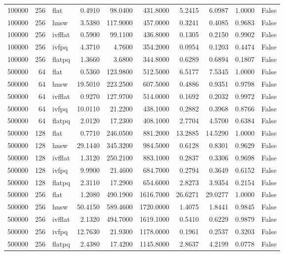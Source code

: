 \begin{tabular}{rrlrrrrrrr}
100000 & 256 & flat & 0.4910 & 98.0400 & 431.8000 & 5.2415 & 6.0987 & 1.0000 & False \\
100000 & 256 & hnsw & 3.5380 & 117.9000 & 457.0000 & 0.3241 & 0.4085 & 0.9683 & False \\
100000 & 256 & ivfflat & 0.5900 & 99.1100 & 436.8000 & 0.1305 & 0.2150 & 0.9902 & False \\
100000 & 256 & ivfpq & 4.3710 & 4.7600 & 354.2000 & 0.0954 & 0.1203 & 0.4474 & False \\
100000 & 256 & flatpq & 1.3660 & 3.6800 & 344.8000 & 0.6289 & 0.6894 & 0.1807 & False \\
500000 & 64 & flat & 0.5360 & 123.9800 & 512.5000 & 6.5177 & 7.5345 & 1.0000 & False \\
500000 & 64 & hnsw & 19.5010 & 223.2500 & 607.5000 & 0.4886 & 0.9351 & 0.9798 & False \\
500000 & 64 & ivfflat & 0.9270 & 127.9700 & 514.0000 & 0.1692 & 0.2032 & 0.9972 & False \\
500000 & 64 & ivfpq & 10.0110 & 21.2200 & 438.1000 & 0.2882 & 0.3968 & 0.8766 & False \\
500000 & 64 & flatpq & 2.0120 & 17.2300 & 408.1000 & 2.7704 & 4.5700 & 0.6384 & False \\
500000 & 128 & flat & 0.7710 & 246.0500 & 881.2000 & 13.2885 & 14.5290 & 1.0000 & False \\
500000 & 128 & hnsw & 29.1440 & 345.3200 & 984.5000 & 0.6128 & 0.8301 & 0.9629 & False \\
500000 & 128 & ivfflat & 1.3120 & 250.2100 & 883.1000 & 0.2837 & 0.3306 & 0.9698 & False \\
500000 & 128 & ivfpq & 9.9900 & 21.4600 & 684.7000 & 0.2794 & 0.3649 & 0.6152 & False \\
500000 & 128 & flatpq & 2.3110 & 17.2900 & 654.6000 & 2.8273 & 3.9354 & 0.2154 & False \\
500000 & 256 & flat & 1.2080 & 490.1900 & 1616.7000 & 26.6271 & 29.0277 & 1.0000 & False \\
500000 & 256 & hnsw & 50.4150 & 589.4600 & 1720.0000 & 1.4075 & 1.8441 & 0.9845 & False \\
500000 & 256 & ivfflat & 2.1320 & 494.7000 & 1619.1000 & 0.5410 & 0.6229 & 0.9879 & False \\
500000 & 256 & ivfpq & 12.7630 & 21.9300 & 1178.0000 & 0.1961 & 0.2537 & 0.3203 & False \\
500000 & 256 & flatpq & 2.4380 & 17.4200 & 1145.8000 & 2.8637 & 4.2199 & 0.0778 & False \\

\end{tabular}
